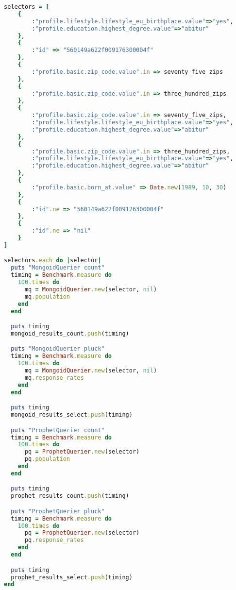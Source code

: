 \begin{appendix}
\begin{lstlisting}[language=Ruby]
selectors = [
    { 
        :"profile.lifestyle.lifestyle_eu_birthplace.value"=>"yes",
        :"profile.education.highest_degree.value"=>"abitur" 
    },
    { 
        :"id" => "560149a622f009176300004f" 
    },
    { 
        :"profile.basic.zip_code.value".in => seventy_five_zips 
    },
    { 
        :"profile.basic.zip_code.value".in => three_hundred_zips
    },
    { 
        :"profile.basic.zip_code.value".in => seventy_five_zips,
        :"profile.lifestyle.lifestyle_eu_birthplace.value"=>"yes", 
        :"profile.education.highest_degree.value"=>"abitur" 
    },
    { 
        :"profile.basic.zip_code.value".in => three_hundred_zips,
        :"profile.lifestyle.lifestyle_eu_birthplace.value"=>"yes", 
        :"profile.education.highest_degree.value"=>"abitur" 
    },
    { 
        :"profile.basic.born_at.value" => Date.new(1989, 10, 30) 
    },
    { 
        :"id".ne => "560149a622f009176300004f" 
    },
    { 
        :"id".ne => "nil" 
    }
]

selectors.each do |selector|
  puts "MongoidQuerier count"
  timing = Benchmark.measure do
    100.times do
      mq = MongoidQuerier.new(selector, nil)
      mq.population
    end
  end

  puts timing
  mongoid_results_count.push(timing)

  puts "MongoidQuerier pluck"
  timing = Benchmark.measure do
    100.times do
      mq = MongoidQuerier.new(selector, nil)
      mq.response_rates
    end
  end

  puts timing
  mongoid_results_select.push(timing)

  puts "ProphetQuerier count"
  timing = Benchmark.measure do
    100.times do
      pq = ProphetQuerier.new(selector)
      pq.population
    end
  end

  puts timing
  prophet_results_count.push(timing)

  puts "ProphetQuerier pluck"
  timing = Benchmark.measure do
    100.times do
      pq = ProphetQuerier.new(selector)
      pq.response_rates
    end
  end

  puts timing
  prophet_results_select.push(timing)
end

\end{lstlisting}

\end{appendix}
